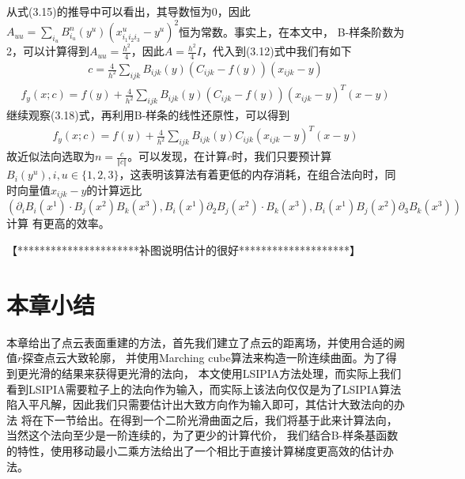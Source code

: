 从式(3.15)的推导中可以看出，其导数恒为0，因此$A_{uu} = \sum_{i_u} B_{i_u}^n(y^u) (x_{i_1 i_2 i_3}^u - y^u)^2$恒为常数。事实上，在本文中，
B-样条阶数为2，可以计算得到$A_{uu} = \frac{h^2}{4}$，因此$A = \frac{h^2}{4}I$，代入到(3.12)式中我们有如下
\begin{equation}
    \begin{split}
        c = \frac{4}{h^2}\sum_{ijk}B_{ijk}(y)(C_{ijk} - f(y))(x_{ijk} - y)
    \end{split}
\end{equation}
\begin{equation}
    \begin{split}
        f_y(x;c) = f(y) + \frac{4}{h^2}\sum_{ijk}B_{ijk}(y)(C_{ijk} - f(y))(x_{ijk} - y)^T(x - y)
    \end{split}
\end{equation}
继续观察(3.18)式，再利用B-样条的线性还原性，可以得到
\begin{align}
    f_y(x;c) = f(y) + \frac{4}{h^2}\sum_{ijk}B_{ijk}(y)C_{ijk}(x_{ijk} - y)^T(x - y)
\end{align}
故近似法向选取为$n = \frac{c}{\Vert c\Vert}$。可以发现，在计算$c$时，我们只要预计算$B_{i}(y^u), i,u \in \{1,2,3\}$，这表明该算法有着更低的内存消耗，在组合法向时，同时向量值$x_{ijk} - y$的计算远比$(\partial_i B_i(x^1) \cdot B_j(x^2)B_k(x^3), B_i(x^1)\partial_2 B_j(x^2)\cdot B_k(x^3), B_i(x^1)B_j(x^2)\partial_3B_k(x^3))$计算
有更高的效率。

【**********************补图说明估计的很好********************】
\section{本章小结}
本章给出了点云表面重建的方法，首先我们建立了点云的距离场，并使用合适的阙值$r$探查点云大致轮廓，
并使用Marching cube算法来构造一阶连续曲面。为了得到更光滑的结果来获得更光滑的法向，
本文使用LSIPIA方法处理，而实际上我们看到LSIPIA需要粒子上的法向作为输入，而实际上该法向仅仅是为了LSIPIA算法
陷入平凡解，因此我们只需要估计出大致方向作为输入即可，其估计大致法向的办法
将在下一节给出。在得到一个二阶光滑曲面之后，我们将基于此来计算法向，当然这个法向至少是一阶连续的，为了更少的计算代价，
我们结合B-样条基函数的特性，使用移动最小二乘方法给出了一个相比于直接计算梯度更高效的估计办法。



